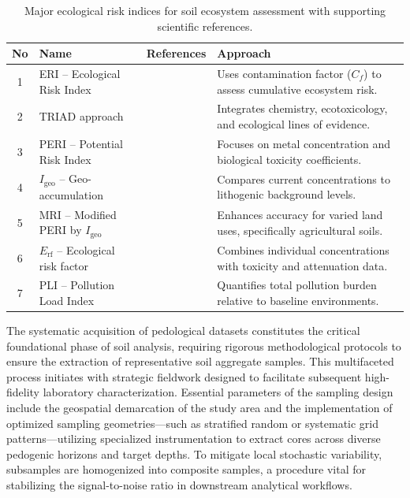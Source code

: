 \documentclass[sn-mathphys-num]{sn-jnl}
\begin{document}
\begin{table}[htbp]
\centering
\caption{Major ecological risk indices for soil ecosystem assessment with
    supporting scientific references.}
\label{tab2_expanded}
\begin{tabularx}{\textwidth}{@{} c p{3cm} X p{5cm} @{}}
\toprule
\textbf{No} & \textbf{Name} & \textbf{References} & \textbf{Approach} \\
\midrule
1 & ERI -- Ecological Risk Index
    & \cite{Wang2025,Egbueri2020,Adewumi2024,ElSorogy2025,Sidoruk2023,Siddig2025,Fan2025,Proshad2025,AnsoarRodriguez2025}
    & Uses contamination factor ($C_f$) to assess cumulative ecosystem risk. \\[4pt]
2 & TRIAD approach
    & \cite{Kim2024,Chon2011,LindhLemenkova2023b,Rasafi2021,Stojic2019,Mohammad2025,Toumi2025,Yasir2025}
    & Integrates chemistry, ecotoxicology, and ecological lines of evidence. \\[4pt]
3 & PERI -- Potential Risk Index
    & \cite{AnsoarRodriguez2025,Ferreira2022,Li2025a,Sidoruk2023,Siddig2025,Li2020,Wang2024a,Wang2025}
    & Focuses on metal concentration and biological toxicity coefficients. \\[4pt]
4 & $I_{\mathrm{geo}}$ -- Geo-accumulation
    & \cite{Li2014,ElSorogy2025,Wang2020,Sidoruk2023,Siddig2025,AliZerrouki2021,LindhLemenkova2022a,Racic2025}
    & Compares current concentrations to lithogenic background levels. \\[4pt]
5 & MRI -- Modified PERI by $I_{\mathrm{geo}}$
    & \cite{Liu2021,Ferreira2022,Siddig2025,Li2019,Adewumi2024,Wang2024a,Wang2025,Proshad2025}
    & Enhances accuracy for varied land uses, specifically agricultural soils. \\[4pt]
6 & $E_{\mathrm{rf}}$ -- Ecological risk factor
    & \cite{Li2025a,Liu2021,Shetty2025,Marthandan2020,Sun2025,Sidoruk2023}
    & Combines individual concentrations with toxicity and attenuation data. \\[4pt]
7 & PLI -- Pollution Load Index
    & \cite{Li2022b,Chukwuonye2025,Wan2019,Mukhopadhyay2020,Sidoruk2023,Li2020,Wang2020,ElSorogy2025}
    & Quantifies total pollution burden relative to baseline environments. \\
\bottomrule
\end{tabularx}
\end{table}

The systematic acquisition of pedological datasets constitutes the critical
foundational phase of soil analysis, requiring rigorous methodological
protocols to ensure the extraction of representative soil aggregate samples.
This multifaceted process initiates with strategic fieldwork designed to
facilitate subsequent high-fidelity laboratory characterization. Essential
parameters of the sampling design include the geospatial demarcation of the
study area and the implementation of optimized sampling geometries---such as
stratified random or systematic grid patterns---utilizing specialized
instrumentation to extract cores across diverse pedogenic horizons and target
depths. To mitigate local stochastic variability, subsamples are homogenized
into composite samples, a procedure vital for stabilizing the signal-to-noise
ratio in downstream analytical workflows.
\end{document}
